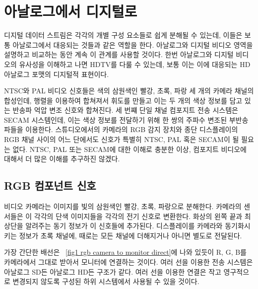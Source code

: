 \chapter{아날로그에서 디지털로}

디지털 데이터 스트림은 각각의 개별 구성 요소들로 쉽게 분해될 수 있는데, 이들은 보통 아날로그에서 대응되는 것들과 같은 역할을 한다.
아날로그와 디지털 비디오 영역을 설명하고 비교하는 동안 계속 이 관계를 사용할 것이다.
한번 아날로그와 디지털 비디오의 유사성을 이해하고 나면 HDTV를 다룰 수 있는데, 보통 이는 이에 대응되는 HD 아날로그 포맷의 디지털적 표현이다.


NTSC와 PAL 비디오 신호들은 색의 삼원색인 빨강, 초록, 파랑 세 개의 카메라 채널의 합성인데, 행렬을 이용하여 합쳐져서 휘도를 만들고 이는 두 개의 색상 정보를 담고 있는 반송파 억압 변조 신호와 합쳐진다.
세 번쨰 단일 채널 컴포지트 전송 시스템은 SECAM 시스템인데, 이는 색상 정보를 전달하기 위해 한 쌍의 주파수 변조된 부반송파들을 이용한다.
스튜디오에서의 카메라의 RGB 감지 장치와 종단 디스플레이의 RGB 채널 사이의 어느 단에서도 신호가 특별히 NTSC, PAL 혹은 SECAM이 될 필요는 없다.
NTSC, PAL 또는 SECAM에 대한 이해로 충분한 이상, 컴포지트 비디오에 대해서 더 많은 이해를 추구하진 않겠다.

\section{RGB 컴포넌트 신호}
비디오 카메라는 이미지를 빛의 삼원색인 빨강, 초록, 파랑으로 분해한다. 카메라의 센서들은 이 각각의 단색 이미지들을 각각의 전기 신호로 변환한다.
화상의 왼쪽 끝과 최상단을 알려주는 동기 정보가 이 신호들에 추가된다. 디스플레이를 카메라와 동기화시키는 정보가 초록 채널에, 때로는 모든 채널에 더해지거나 아니면 별도로 전달된다.


가장 간단한 배선은 \figurename~\ref{fig1 rgb camera to monitor direct}에 나와 있듯이 R, G, B를 카메라에서 그대로 받아서 모니터에 연결하는 것이다. 여러 선을 이용한 전송 시스템은 아날로그 SD든 아날로그 HD든 구조가 같다.
여러 선을 이용한 연결은 작고 영구적으로 변경되지 않도록 구성된 하위 시스템에서 사용될 수 있을 것이다.


